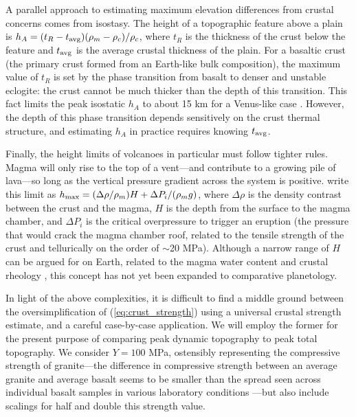 \documentclass[trackchanges]{aastex63}
\begin{document}
A parallel approach to estimating maximum elevation differences from crustal concerns comes from isostasy. The height of a topographic feature above a plain is $h_A = (t_R - t_{\rm avg})(\rho_m - \rho_c)/\rho_c$, where $t_R$ is the thickness of the crust below the feature and $t_{\rm avg}$ is the average crustal thickness of the plain. For a basaltic crust (the primary crust formed from an Earth-like bulk composition), the maximum value of $t_R$ is set by the phase transition from basalt to denser and unstable eclogite: the crust cannot be much thicker than the depth of this transition. This fact limits the peak isostatic $h_A$ to about 15 km for a Venus-like case \citep{jull_implications_1995}. However, the depth of this phase transition depends sensitively on the crust thermal structure, and estimating $h_A$ in practice requires knowing $t_{\rm avg}$.

Finally, the height limits of volcanoes in particular must follow tighter rules. Magma will only rise to the top of a vent---and contribute to a growing pile of lava---so long as the vertical pressure gradient across the system is positive. \citet{castruccio_influence_2017} write this limit as $h_{\rm max} = (\Delta\rho/\rho_m) H + \Delta P_i/(\rho_m g)$, where $\Delta\rho$ is the density contrast between the crust and the magma, $H$ is the depth from the surface to the magma chamber, and $\Delta P_i$ is the critical overpressure to trigger an eruption (the pressure that would crack the magma chamber roof, related to the tensile strength of the crust and tellurically on the order of $\sim$20 MPa). Although a narrow range of $H$ can be argued for on Earth, related to the magma water content and crustal rheology \citep{huber_optimal_2019}, this concept has not yet been expanded to comparative planetology. 

In light of the above complexities, it is difficult to find a middle ground between the oversimplification of (\ref{eq:crust_strength}) using a universal crustal strength estimate, and a careful case-by-case application. %
We will employ the former for the present purpose of comparing peak dynamic topography to peak total topography. We consider $Y = 100$ MPa, ostensibly representing the compressive strength of granite---the difference in compressive strength between an average granite and average basalt seems to be smaller than the spread seen across individual basalt samples in various laboratory conditions \citep{heap_low_2017}---but also include scalings for half and double this strength value.
\end{document}
